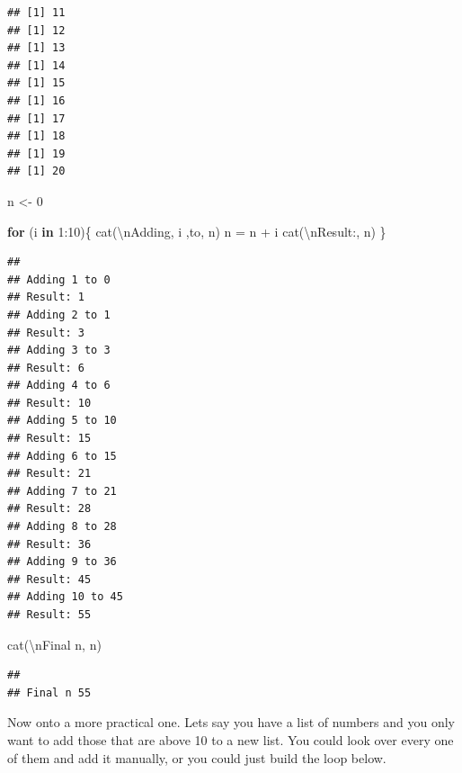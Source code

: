 \documentclass[
]{book}
\newenvironment{Shaded}{\begin{snugshade}}{\end{snugshade}}
\newcommand{\ControlFlowTok}[1]{\textcolor[rgb]{0.13,0.29,0.53}{\textbf{#1}}}
\newcommand{\DecValTok}[1]{\textcolor[rgb]{0.00,0.00,0.81}{#1}}
\newcommand{\FunctionTok}[1]{\textcolor[rgb]{0.00,0.00,0.00}{#1}}
\newcommand{\NormalTok}[1]{#1}
\newcommand{\OtherTok}[1]{\textcolor[rgb]{0.56,0.35,0.01}{#1}}
\newcommand{\SpecialCharTok}[1]{\textcolor[rgb]{0.00,0.00,0.00}{#1}}
\newcommand{\StringTok}[1]{\textcolor[rgb]{0.31,0.60,0.02}{#1}}
\begin{document}
\begin{verbatim}
## [1] 11
## [1] 12
## [1] 13
## [1] 14
## [1] 15
## [1] 16
## [1] 17
## [1] 18
## [1] 19
## [1] 20
\end{verbatim}

\begin{Shaded}
\begin{Highlighting}[]
\NormalTok{n }\OtherTok{\textless{}{-}} \DecValTok{0}

\ControlFlowTok{for}\NormalTok{ (i }\ControlFlowTok{in} \DecValTok{1}\SpecialCharTok{:}\DecValTok{10}\NormalTok{)\{}
  \FunctionTok{cat}\NormalTok{(}\StringTok{\textquotesingle{}}\SpecialCharTok{\textbackslash{}n}\StringTok{Adding\textquotesingle{}}\NormalTok{, i ,}\StringTok{\textquotesingle{}to\textquotesingle{}}\NormalTok{, n)}
\NormalTok{  n }\OtherTok{=}\NormalTok{ n }\SpecialCharTok{+}\NormalTok{ i}
  \FunctionTok{cat}\NormalTok{(}\StringTok{\textquotesingle{}}\SpecialCharTok{\textbackslash{}n}\StringTok{Result:\textquotesingle{}}\NormalTok{, n)}
\NormalTok{\}}
\end{Highlighting}
\end{Shaded}

\begin{verbatim}
## 
## Adding 1 to 0
## Result: 1
## Adding 2 to 1
## Result: 3
## Adding 3 to 3
## Result: 6
## Adding 4 to 6
## Result: 10
## Adding 5 to 10
## Result: 15
## Adding 6 to 15
## Result: 21
## Adding 7 to 21
## Result: 28
## Adding 8 to 28
## Result: 36
## Adding 9 to 36
## Result: 45
## Adding 10 to 45
## Result: 55
\end{verbatim}

\begin{Shaded}
\begin{Highlighting}[]
\FunctionTok{cat}\NormalTok{(}\StringTok{\textquotesingle{}}\SpecialCharTok{\textbackslash{}n}\StringTok{Final n\textquotesingle{}}\NormalTok{, n)}
\end{Highlighting}
\end{Shaded}

\begin{verbatim}
## 
## Final n 55
\end{verbatim}

Now onto a more practical one.
Lets say you have a list of numbers and you only want to add those that are above 10 to a new list.
You could look over every one of them and add it manually, or you could just build the loop below.
\end{document}

